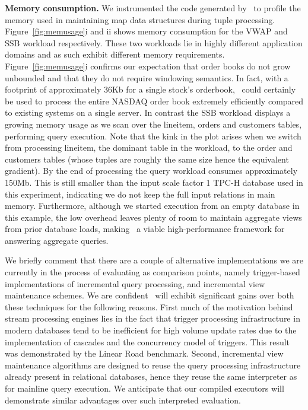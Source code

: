 \textbf{Memory consumption.}
We instrumented the code generated by \compiler\ to profile the memory used in
maintaining map data structures during tuple processing.
Figure~\ref{fig:memusage}i and ii shows memory consumption for the VWAP
and SSB workload respectively. These two workloads lie in highly different
application domains and as such exhibit different memory requirements.
Figure~\ref{fig:memusage}i confirms our expectation that order books do not
grow unbounded and that they do not require windowing semantics. In fact, with
a footprint of approximately 36Kb for a single stock's orderbook, \compiler\
could certainly be used to process the entire NASDAQ order book extremely
efficiently compared to existing systems on a single server.
In contrast the SSB workload displays a growing memory usage as we scan over the
lineitem, orders and customers tables, performing query execution. Note that the
kink in the plot arises when we switch from processing lineitem, the dominant
table in the workload, to the order and customers tables (whose tuples are
roughly the same size hence the equivalent gradient). By the end of processing
the query workload consumes approximately 150Mb. This is still smaller than the
input scale factor 1 TPC-H database used in this experiment, indicating we do
not keep the full input relations in main memory. Furthermore, although we
started execution from an empty database in this example, the low overhead
leaves plenty of room to maintain aggregate views from prior database loads,
making \compiler\ a viable high-performance framework for answering aggregate
queries.

We briefly comment that there are a couple of alternative implementations we
are currently in the process of evaluating as comparison points, namely
trigger-based implementations of incremental query processing, and incremental
view maintenance schemes. We are confident \compiler\ will exhibit significant
gains over both these techniques for the following reasons. First much of the
motivation behind stream processing engines lies in the fact that trigger
processing infrastructure in modern databases tend to be inefficient for
high volume update rates due to the implementation of cascades and the
concurrency model of triggers. This result was demonstrated by the Linear Road
benchmark. Second, incremental view maintenance algorithms are designed to
reuse the query processing infrastructure already present in relational
databases, hence they reuse the same interpreter as for mainline query
execution. We anticipate that our compiled executors will demonstrate
similar advantages over such interpreted evaluation.


